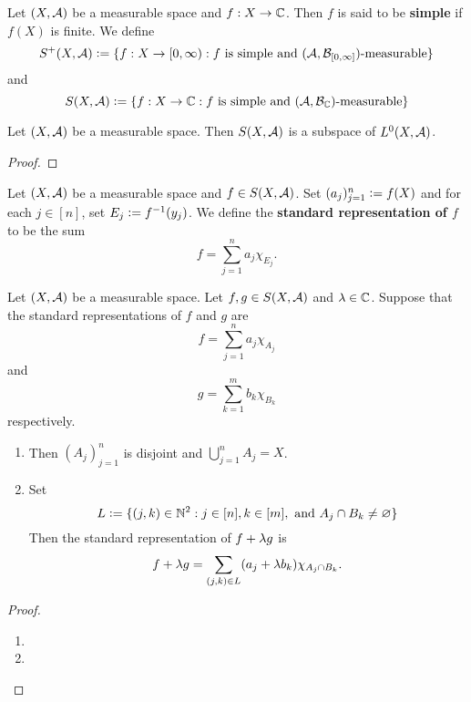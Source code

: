 \documentclass{book}
\begin{document}
	\begin{defn} 
		Let $(X, \mathcal{A})$ be a measurable space and $f:X \rightarrow \mathbb{C}$. Then $f$ is said to be \textbf{simple} if $f(X)$ is finite. We define 
		$$S^+(X,\mathcal{A}) \vcentcolon= \{f:X \rightarrow [0,\infty): f \text{ is simple and $(\mathcal{A}, \mathcal{B}_{[0,\infty]})$-measurable}\}$$ 
		and 
		$$S(X,\mathcal{A}) \vcentcolon= \{f: X \rightarrow \mathbb{C}: f \text{ is simple and $(\mathcal{A}, \mathcal{B}_{\mathbb{C}})$-measurable}\}$$
	\end{defn}
	
	\begin{ex} 
		Let $(X, \mathcal{A})$ be a measurable space. Then $S(X, \mathcal{A}) $ is a subspace of $L^0(X, \mathcal{A})$.
	\end{ex}
	
	\begin{proof}
	\end{proof}
	
	\begin{defn}  
		Let $(X, \mathcal{A})$ be a measurable space and $f \in S(X, \mathcal{A})$. Set $(a_j)_{j=1}^n \vcentcolon= f(X)$ and for each $j \in [n]$, set $E_j \vcentcolon= f^{-1}(y_j)$. We define the \textbf{standard representation of $f$} to be the sum 
		$$f = \sum\limits_{j=1}^n a_j\chi_{E_j}.$$ 
	\end{defn}
	
	\begin{ex}
		Let $(X, \mathcal{A})$ be a measurable space. Let $f,g \in S(X, \mathcal{A})$ and $\lambda \in \mathbb{C}$. Suppose that the standard representations of $f$ and $g$ are 
		$$f = \sum\limits_{j=1}^na_j \chi_{A_j}$$ 
		and 
		$$g = \sum\limits_{k=1}^m b_k\chi_{B_k}$$
		respectively.
		\begin{enumerate}
			\item Then $(A_j)_{j=1}^n$ is disjoint and $\bigcup\limits_{j=1}^n A_j = X$.
			\item Set
			$$L \vcentcolon= \{(j,k) \in \mathbb{N}^2: j \in [n], k \in [m], \text{ and } A_j \cap B_k \neq \varnothing\}$$  
			Then the standard representation of $f + \lambda g$ is 
			$$f + \lambda g = \sum\limits_{(j,k) \in L} (a_j + \lambda b_k) \chi_{A_j \cap B_k}.$$
		\end{enumerate} 
	\end{ex}

	\begin{proof}\
		\begin{enumerate}
			\item 
			\item 
		\end{enumerate}
	\end{proof}
	
\end{document}
